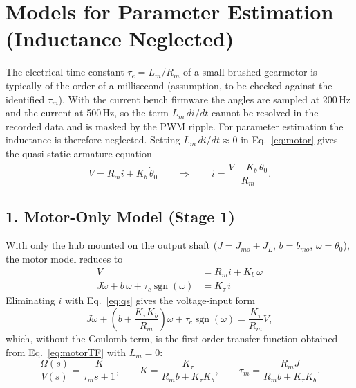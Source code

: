 \documentclass[a4paper,11pt]{article}
\newcommand{\sgn}{\operatorname{sgn}}
\begin{document}
\section{Models for Parameter Estimation (Inductance Neglected)}
\label{sec:estmodels}
The electrical time constant $\tau_e = L_m/R_m$ of a small brushed gearmotor is typically of the order of a millisecond (assumption, to be checked against the identified $\tau_m$). With the current bench firmware the angles are sampled at 200\,Hz and the current at 500\,Hz, so the term $L_m\, di/dt$ cannot be resolved in the recorded data and is masked by the PWM ripple. For parameter estimation the inductance is therefore neglected. Setting $L_m\, di/dt \approx 0$ in Eq.~\eqref{eq:motor} gives the quasi-static armature equation
\begin{equation}
  V = R_m i + K_b\, \dot\theta_0
  \qquad\Rightarrow\qquad
  i = \frac{V - K_b\, \dot\theta_0}{R_m} .
  \label{eq:qs}
\end{equation}

\subsection{1. Motor-Only Model (Stage 1)}
With only the hub mounted on the output shaft ($J = J_{mo} + J_L$, $b = b_{mo}$, $\omega = \dot\theta_0$), the motor model reduces to
\begin{equation}
\boxed{
\begin{aligned}
  V &= R_m i + K_b\, \omega\\
  J \dot\omega + b\, \omega + \tau_c \sgn(\omega) &= K_\tau\, i
\end{aligned}
}
\label{eq:motor_est}
\end{equation}
Eliminating $i$ with Eq.~\eqref{eq:qs} gives the voltage-input form
\begin{equation}
  J \dot\omega + \left(b + \frac{K_\tau K_b}{R_m}\right)\omega + \tau_c \sgn(\omega) = \frac{K_\tau}{R_m} V ,
\end{equation}
which, without the Coulomb term, is the first-order transfer function obtained from Eq.~\eqref{eq:motorTF} with $L_m = 0$:
\begin{equation}
  \frac{\Omega(s)}{V(s)} = \frac{K}{\tau_m s + 1}, \qquad K = \frac{K_\tau}{R_m b + K_\tau K_b}, \qquad \tau_m = \frac{R_m J}{R_m b + K_\tau K_b} .
  \label{eq:motor1st}
\end{equation}
\end{document}
